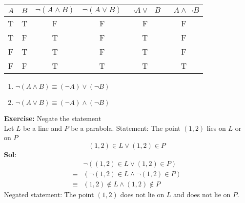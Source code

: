 \documentclass[11pt, a4paper]{memoir}
\theoremstyle{change}
\theoremstyle{plain}
\theoremstyle{nonumberplain}
\numberwithin{equation}{section}
\begin{document}
\begin{table}[ht]
    \centering
    \begin{tabular}{|c|c|c|c|c|c|}
        \hline
        $A$ & $B$ & $\neg (A \wedge B)$ & $\neg (A \vee B)$ & $\neg A \vee \neg B$ & $\neg A \wedge \neg B$\\
        \hline
        T & T & F & F & F & F\\
        \hline
        T & F & T & F & T & F\\
        \hline
        F & T & T & F & T & F\\
        \hline 
        F & F & T & T & T & T\\ 
        \hline
    \end{tabular}
    \end{table}

\begin{enumerate}
    \item $\neg (A \wedge B) \equiv (\neg A) \vee (\neg B)$
    \item $\neg (A \vee B) \equiv (\neg A) \wedge (\neg B)$
\end{enumerate}
\textbf{Exercise:} Negate the statement\\ 
Let $L$ be a line and $P$ be a parabola.
Statement: The point $(1, 2)$ lies on $L$ or on $P$ $$(1,2) \in L \vee (1,2) \in P$$
\textbf{Sol}:
\begin{align*}
    &\neg ((1,2) \in L \vee (1,2) \in P)\\
    \equiv &(\neg (1,2) \in L \wedge \neg (1,2) \in P)\\
    \equiv &(1,2) \notin L \wedge (1,2) \notin P
\end{align*}
Negated statement: The point $(1,2)$ does not lie on $L$ and does not lie on $P$.
\end{document}

